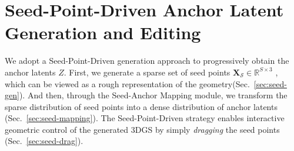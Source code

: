 \section{Seed-Point-Driven Anchor Latent Generation and Editing}
\label{sec:seed-point-driven}

We adopt a Seed-Point-Driven generation approach to progressively obtain the anchor latents $Z$. First, we generate a sparse set of seed points \( \mathbf{X}_\mathcal{S} \in \mathbb{R}^{S \times 3} \) , which can be viewed as a rough representation of the geometry(Sec.~\ref{sec:seed-gen}). And then, through the Seed-Anchor Mapping module, we transform the sparse distribution of seed points into a dense distribution of anchor latents (Sec.~\ref{sec:seed-mapping}). The Seed-Point-Driven strategy enables interactive geometric control of the generated 3DGS by simply \emph{dragging} the seed points (Sec.~\ref{sec:seed-drag}).


